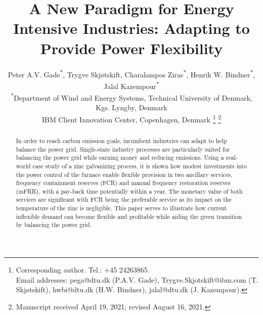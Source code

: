 \documentclass[lettersize,journal]{IEEEtran}
\begin{document}
\title{A New Paradigm for Energy Intensive Industries: Adapting to Provide Power Flexibility}

\author{Peter A.V. Gade\textsuperscript{*}\textsuperscript{\textdagger}, Trygve Skjøtskift\textsuperscript{\textdagger}, Charalampos Ziras\textsuperscript{*}, Henrik W. Bindner\textsuperscript{*}, Jalal Kazempour\textsuperscript{*} \\
    \textsuperscript{*}Department of Wind and Energy Systems, Technical University of Denmark, Kgs. Lyngby, Denmark \\
    \textsuperscript{\textdagger}IBM Client Innovation Center, Copenhagen, Denmark
    \thanks{Corresponding author. Tel.: +45 24263865. \\ Email addresses: pega@dtu.dk (P.A.V. Gade), Trygve.Skjotskift@ibm.com (T. Skjøtskift), hwbi@dtu.dk (H.W. Bindner), jalal@dtu.dk (J. Kazempour).}%
    \thanks{Manuscript received April 19, 2021; revised August 16, 2021.}}




\maketitle


\begin{abstract}
    In order to reach carbon emission goals, incumbent industries can adapt to help balance the power grid. Single-state industry processes are particularly suited for balancing the power grid while earning money and reducing emissions. Using a real-world case study of a zinc galvanizing process, it is shown how modest investments into the power control of the furnace enable flexible provision in two ancillary services, frequency containment reserves (FCR) and manual
    frequency restoration reserves (mFRR), with a pay-back time potentially within a year. The monetary value of both services are significant with FCR being the preferable service as its impact on the temperature of the zinc is negligible. This paper serves to illustrate how current inflexible demand can become flexible and profitable while aiding the green transition by balancing the power grid.
\end{abstract}
\end{document}
